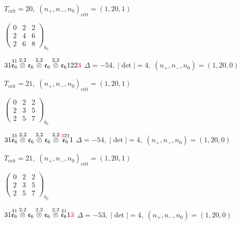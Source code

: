 \documentclass[10pt]{article}
\begin{document}
\hspace{1em}$T_{\text{crit}}=20,\; (n_+,n_-,n_0)_{\text{crit}}=(1,20,1)$

\hspace{2em}$\left(\begin{smallmatrix}0 & 2 & 2 \\ 2 & 4 & 6 \\ 2 & 6 & 8\end{smallmatrix}\right)_{\!b_0}$

\smallskip

$31\overset{31}{\mathfrak{e}_6}\overset{2,2}{\otimes}\mathfrak{e}_6\overset{2,2}{\otimes}\mathfrak{e}_6\overset{2,2}{\otimes}\mathfrak{e}_6122\textcolor{red}{3}$ \quad $\Delta=-54,\; |\det|=4,\; (n_+,n_-,n_0)=(1,20,0)$

\hspace{1em}$T_{\text{crit}}=21,\; (n_+,n_-,n_0)_{\text{crit}}=(1,20,1)$

\hspace{2em}$\left(\begin{smallmatrix}0 & 2 & 2 \\ 2 & 3 & 5 \\ 2 & 5 & 7\end{smallmatrix}\right)_{\!b_0}$

\smallskip

$31\overset{31}{\mathfrak{e}_6}\overset{2,2}{\otimes}\mathfrak{e}_6\overset{2,2}{\otimes}\mathfrak{e}_6\overset{2,2}{\otimes}\overset{\textcolor{red}{3}21}{\mathfrak{e}_6}1$ \quad $\Delta=-54,\; |\det|=4,\; (n_+,n_-,n_0)=(1,20,0)$

\hspace{1em}$T_{\text{crit}}=21,\; (n_+,n_-,n_0)_{\text{crit}}=(1,20,1)$

\hspace{2em}$\left(\begin{smallmatrix}0 & 2 & 2 \\ 2 & 3 & 5 \\ 2 & 5 & 7\end{smallmatrix}\right)_{\!b_0}$

$31\overset{31}{\mathfrak{e}_6}\overset{2,2}{\otimes}\mathfrak{e}_6\overset{2,2}{\otimes}\mathfrak{e}_6\overset{2,2}{\otimes}\overset{21}{\mathfrak{e}_6}1\textcolor{red}{3}$ \quad $\Delta=-53,\; |\det|=4,\; (n_+,n_-,n_0)=(1,20,0)$
\end{document}
